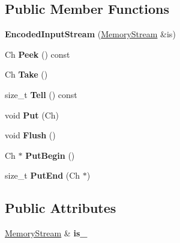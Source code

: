 \subsection*{Public Member Functions}
\begin{DoxyCompactItemize}
\item 
{\bfseries Encoded\+Input\+Stream} (\hyperlink{a00224}{Memory\+Stream} \&is)\hypertarget{a00093_a45ae1fa4f5bb8295df234fa3ac91ddef}{}\label{a00093_a45ae1fa4f5bb8295df234fa3ac91ddef}

\item 
Ch {\bfseries Peek} () const \hypertarget{a00093_aecd5a2355826e77f7958a26b5449ee62}{}\label{a00093_aecd5a2355826e77f7958a26b5449ee62}

\item 
Ch {\bfseries Take} ()\hypertarget{a00093_a29eeabe922bb6c7cbb5c16fe8a3a7859}{}\label{a00093_a29eeabe922bb6c7cbb5c16fe8a3a7859}

\item 
size\+\_\+t {\bfseries Tell} () const \hypertarget{a00093_a8473e37416580962d8d491350c9fab2b}{}\label{a00093_a8473e37416580962d8d491350c9fab2b}

\item 
void {\bfseries Put} (Ch)\hypertarget{a00093_a39fe296cfa45d7f8ef5adc0dd30036c2}{}\label{a00093_a39fe296cfa45d7f8ef5adc0dd30036c2}

\item 
void {\bfseries Flush} ()\hypertarget{a00093_ad911c889ebd4ded9bcf9d31ca124f9a7}{}\label{a00093_ad911c889ebd4ded9bcf9d31ca124f9a7}

\item 
Ch $\ast$ {\bfseries Put\+Begin} ()\hypertarget{a00093_a3ca21c33ccc4a12fe2f806b865bd3ebd}{}\label{a00093_a3ca21c33ccc4a12fe2f806b865bd3ebd}

\item 
size\+\_\+t {\bfseries Put\+End} (Ch $\ast$)\hypertarget{a00093_ad87990d605c72529aeb78509d5b393fb}{}\label{a00093_ad87990d605c72529aeb78509d5b393fb}

\end{DoxyCompactItemize}
\subsection*{Public Attributes}
\begin{DoxyCompactItemize}
\item 
\hyperlink{a00224}{Memory\+Stream} \& {\bfseries is\+\_\+}\hypertarget{a00093_ad5e48564bbd14297a4cc445af3a4aa83}{}\label{a00093_ad5e48564bbd14297a4cc445af3a4aa83}

\end{DoxyCompactItemize}


